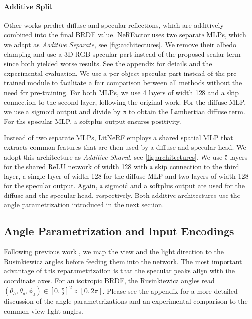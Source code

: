 \paragraph{Additive Split}
Other works predict diffuse and specular reflections, which are additively combined into the final BRDF value. NeRFactor \cite{Zhang2021NeRFactor} uses two separate MLPs, which we adapt as \emph{Additive Separate}, see \cref{fig:architectures}. We remove their albedo clamping and use a 3D RGB specular part instead of the proposed scalar term since both yielded worse results. See the appendix for details and the experimental evaluation. We use a per-object specular part instead of the pre-trained module to facilitate a fair comparison between all methods without the need for pre-training.
For both MLPs, we use 4 layers of width 128 and a skip connection to the second layer, following the original work. For the diffuse MLP, we use a sigmoid output and divide by $\pi$ to obtain the Lambertian diffuse term. For the specular MLP, a softplus output ensures positivity.

Instead of two separate MLPs, LitNeRF \cite{Sarkar23LitNerf} employs a shared spatial MLP that extracts common features that are then used by a diffuse and specular head. We adopt this architecture as \emph{Additive Shared}, see \cref{fig:architectures}. We use 5 layers for the shared ReLU network of width 128 with a skip connection to the third layer, a single layer of width 128 for the diffuse MLP and two layers of width 128 for the specular output. Again, a sigmoid and a softplus output are used for the diffuse and the specular head, respectively. 
Both additive architectures use the angle parametrization introduced in the next section.


\subsection{Angle Parametrization and Input Encodings}
\label{sec:angleAndEncoding}
Following previous work \cite{Zhang2021NeRFactor, sztrajman2021neural}, we map the view and the light direction to the Rusinkiewicz angles \cite{rusinkiewicz1998new} before feeding them into the network. The most important advantage of this reparametrization is that the specular peaks align with the coordinate axes.  For an isotropic BRDF, the Rusinkiewicz angles read $(\theta_h,\theta_d,\phi_d)\in[0,\frac{\pi}{2}]^2\times[0, 2\pi]$. Please see the appendix for a more detailed discussion of the angle parameterizations and an experimental comparison to the common view-light angles.

